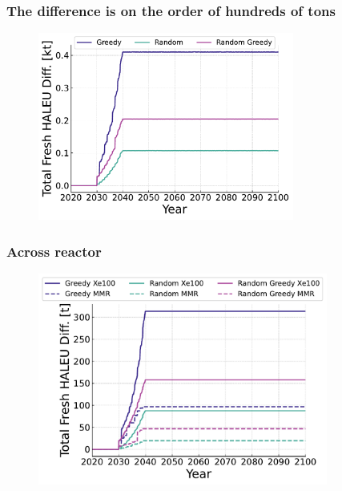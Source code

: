 \documentclass[9pt]{beamer}
\begin{document}
  \begin{frame}
    \frametitle{The difference is on the order of hundreds of tons}
    \begin{figure}
        \centering
        \includegraphics[width=0.75\textwidth]{../images/diff_scheme.pdf}
    \end{figure}
  \end{frame}

  \begin{frame}
    \frametitle{Across reactor}
    \begin{figure}
      \centering
      \includegraphics[width=0.85\textwidth]{../images/diff_reactor_fuel.pdf}
    \end{figure}
  \end{frame}
\end{document}
